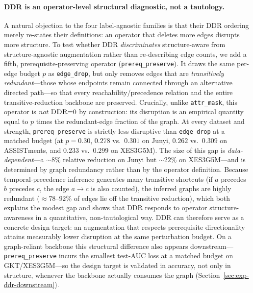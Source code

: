 \documentclass[preprint,10pt,doubleblind]{elsarticle}
\newcommand{\DDR}{\textsc{DDR}}
\begin{document}
\paragraph{\DDR{} is an operator-level structural diagnostic, not a tautology.}
A natural objection to the four label-agnostic families is that their
\DDR{} ordering merely re-states their definitions: an operator that
deletes more edges disrupts more structure. To test whether \DDR{}
\emph{discriminates} structure-aware from structure-agnostic
augmentation rather than re-describing edge counts, we add a fifth,
prerequisite-preserving operator (\texttt{prereq\_preserve}). It draws
the same per-edge budget $p$ as \texttt{edge\_drop}, but only removes
edges that are \emph{transitively redundant}---those whose endpoints
remain connected through an alternative directed path---so that every
reachability/precedence relation and the entire transitive-reduction
backbone are preserved. Crucially, unlike \texttt{attr\_mask}, this
operator is \emph{not} $\DDR{=}0$ by construction: its disruption is an
empirical quantity equal to $p$ times the redundant-edge fraction of the
graph. At every dataset and strength, \texttt{prereq\_preserve} is
strictly less disruptive than \texttt{edge\_drop} at a matched budget
(at $p=0.30$, $0.278$ vs.\ $0.301$ on Junyi, $0.262$ vs.\ $0.309$ on
ASSISTments, and $0.233$ vs.\ $0.299$ on XES3G5M). The size of this gap
is \emph{data-dependent}---a $\sim 8\%$ relative reduction on Junyi but
$\sim 22\%$ on XES3G5M---and is determined by graph redundancy rather
than by the operator definition. Because temporal-precedence inference
generates many transitive shortcuts (if $a$ precedes $b$ precedes $c$,
the edge $a\!\to\!c$ is also counted), the inferred graphs are
highly redundant ($\approx 78$--$92\%$ of edges lie off the transitive
reduction), which both explains the modest gap and shows that \DDR{}
responds to operator structure-awareness in a quantitative,
non-tautological way. \DDR{} can therefore serve as a concrete design
target: an augmentation that respects prerequisite directionality attains
measurably lower disruption at the same perturbation
budget. On a graph-reliant backbone this structural difference also appears
downstream---\texttt{prereq\_preserve} incurs the smallest test-AUC loss at a matched
budget on GKT/XES3G5M---so the design target is validated in accuracy, not
only in structure, whenever the backbone actually consumes the graph
(Section~\ref{sec:exp-ddr-downstream}).
\end{document}
